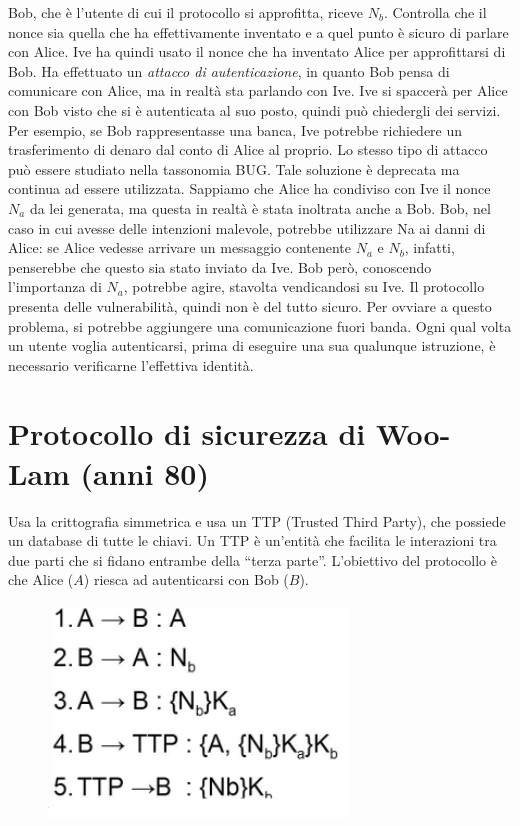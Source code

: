 Bob, che è l'utente di cui il protocollo si approfitta, riceve \(N_b\).
Controlla che il nonce sia quella che
ha effettivamente inventato e a quel punto è sicuro di parlare con Alice.
Ive ha quindi usato il nonce che ha inventato Alice per approfittarsi di
Bob. Ha effettuato un
\textit{attacco di autenticazione}, in quanto Bob pensa di comunicare con
Alice, ma in realtà sta parlando
con Ive.
Ive si spaccerà per Alice con Bob visto che si è autenticata al suo posto,
quindi può chiedergli dei
servizi. Per esempio, se Bob rappresentasse una banca, Ive potrebbe
richiedere un trasferimento
di denaro dal conto di Alice al proprio.
Lo stesso tipo di attacco può essere studiato nella tassonomia BUG. Tale
soluzione è deprecata
ma continua ad essere utilizzata.
Sappiamo che Alice ha condiviso con Ive il nonce \(N_a\) da lei generata, ma
questa in realtà è stata
inoltrata anche a Bob. Bob, nel caso in cui avesse delle intenzioni
malevole, potrebbe utilizzare Na
ai danni di Alice: se Alice vedesse arrivare un messaggio contenente \(N_a\)
e \(N_b\), infatti, penserebbe
che questo sia stato inviato da Ive. Bob però, conoscendo l'importanza di
\(N_a\), potrebbe agire,
stavolta vendicandosi su Ive.
Il protocollo presenta delle vulnerabilità, quindi non è del tutto sicuro.
Per ovviare a questo
problema, si potrebbe aggiungere una comunicazione fuori banda. Ogni qual
volta un utente voglia
autenticarsi, prima di eseguire una sua qualunque istruzione, è necessario
verificarne l'effettiva
identità.

\section{Protocollo di sicurezza di Woo-Lam (anni 80)}

Usa la crittografia simmetrica e usa un TTP (Trusted Third Party), che
possiede un database di
tutte le chiavi. Un TTP è un'entità che facilita le interazioni tra due
parti che si fidano entrambe
della “terza parte”.
L'obiettivo del protocollo è che Alice (\(A\)) riesca ad autenticarsi
con Bob (\(B\)).

\begin{figure}[H]
    \centering
    \includegraphics[width=8cm, keepaspectratio]{capitoli/crittografia/imgs/Mulan.png}
\end{figure}

